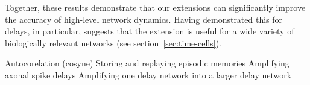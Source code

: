Together, these results demonstrate that our extensions can significantly improve the accuracy of high-level network dynamics.
Having demonstrated this for delays, in particular, suggests that the extension is useful for a wide variety of biologically relevant networks (see section~\ref{sec:time-cells}).

Autocorelation (cosyne)
Storing and replaying episodic memories
Amplifying axonal spike delays
Amplifying one delay network into a larger delay network
